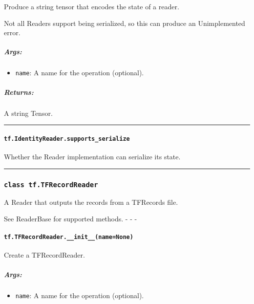 Produce a string tensor that encodes the state of a reader.

Not all Readers support being serialized, so this can produce an
Unimplemented error.

\subparagraph{Args: }\label{args-28}

\begin{itemize}
\tightlist
\item
  \texttt{name}: A name for the operation (optional).
\end{itemize}

\subparagraph{Returns: }\label{returns-24}

A string Tensor.

\begin{center}\rule{0.5\linewidth}{\linethickness}\end{center}

\paragraph{\texorpdfstring{\texttt{tf.IdentityReader.supports\_serialize}
}{tf.IdentityReader.supports\_serialize }}\label{tf.identityreader.supportsux5fserialize}

Whether the Reader implementation can serialize its state.

\begin{center}\rule{0.5\linewidth}{\linethickness}\end{center}

\subsubsection{\texorpdfstring{\texttt{class\ tf.TFRecordReader}
}{class tf.TFRecordReader }}\label{class-tf.tfrecordreader}

A Reader that outputs the records from a TFRecords file.

See ReaderBase for supported methods. - - -

\paragraph{\texorpdfstring{\texttt{tf.TFRecordReader.\_\_init\_\_(name=None)}
}{tf.TFRecordReader.\_\_init\_\_(name=None) }}\label{tf.tfrecordreader.ux5fux5finitux5fux5fnamenone}

Create a TFRecordReader.

\subparagraph{Args: }\label{args-29}

\begin{itemize}
\tightlist
\item
  \texttt{name}: A name for the operation (optional).
\end{itemize}

